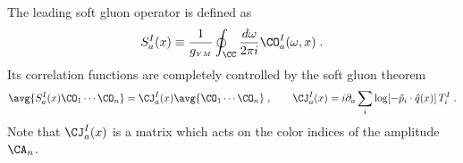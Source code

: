 \documentclass[11pt]{article}
\def\o{{\omega}}
\def\p{{\partial}}
\def\ym{{\scriptscriptstyle YM}}
\begin{document}
The leading soft gluon operator is defined as
\begin{equation}
\begin{split}\label{Sdef-ym}
S^I_a(x) \equiv \frac{1}{g_\ym} \oint_\CC \frac{d\o}{2\pi i}  \CO^I_a(\o,x) \; .
\end{split}
\end{equation}
Its correlation functions are completely controlled by the soft gluon theorem
\begin{equation}\label{Sains-ym}
\avg{ S^I_a(x) \CO_1 \cdots \CO_n } = \CJ^I_a(x) \avg{ \CO_1  \cdots  \CO_n  } \; ,  \qquad \CJ^I_a(x) = i  \p_a  \sum_i \log [ - {\hat p}_i \cdot {\hat q}(x)   ] \, T^I_i \; .
\end{equation}
Note that $\CJ_a^I(x)$ is a matrix which acts on the color indices of the amplitude $\CA_n$.
\end{document}
